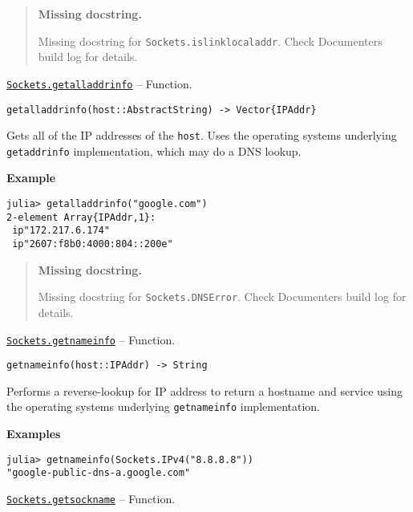 \begin{quote}
\textbf{Missing docstring.}

Missing docstring for \texttt{Sockets.islinklocaladdr}. Check Documenter{\textquotesingle}s build log for details.

\end{quote}

\hypertarget{14820421424669368163}{} 
\hyperlink{14820421424669368163}{\texttt{Sockets.getalladdrinfo}}  -- {Function.}

\begin{adjustwidth}{2em}{0pt}


\begin{verbatim}
getalladdrinfo(host::AbstractString) -> Vector{IPAddr}
\end{verbatim}

Gets all of the IP addresses of the \texttt{host}. Uses the operating system{\textquotesingle}s underlying \texttt{getaddrinfo} implementation, which may do a DNS lookup.

\textbf{Example}


\begin{verbatim}
julia> getalladdrinfo("google.com")
2-element Array{IPAddr,1}:
 ip"172.217.6.174"
 ip"2607:f8b0:4000:804::200e"
\end{verbatim}



\end{adjustwidth}

\begin{quote}
\textbf{Missing docstring.}

Missing docstring for \texttt{Sockets.DNSError}. Check Documenter{\textquotesingle}s build log for details.

\end{quote}

\hypertarget{8933801763213702510}{} 
\hyperlink{8933801763213702510}{\texttt{Sockets.getnameinfo}}  -- {Function.}

\begin{adjustwidth}{2em}{0pt}


\begin{verbatim}
getnameinfo(host::IPAddr) -> String
\end{verbatim}

Performs a reverse-lookup for IP address to return a hostname and service using the operating system{\textquotesingle}s underlying \texttt{getnameinfo} implementation.

\textbf{Examples}


\begin{verbatim}
julia> getnameinfo(Sockets.IPv4("8.8.8.8"))
"google-public-dns-a.google.com"
\end{verbatim}



\end{adjustwidth}
\hypertarget{16393779334284193287}{} 
\hyperlink{16393779334284193287}{\texttt{Sockets.getsockname}}  -- {Function.}

